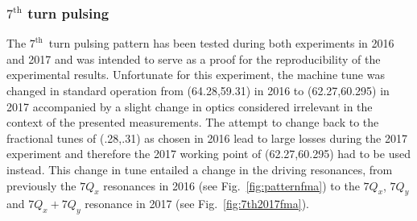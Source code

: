 \documentclass[%
 reprint,
 amsmath,amssymb,
 aps,
prstab,
]{revtex4-1}
\begin{document}
\subsubsection{$7^{\mathrm{th}}$ turn pulsing\label{sec:simex7}}
The $7^{\mathrm{th}}$~turn pulsing pattern has been tested during both experiments in 2016 and 2017 and was intended to serve as a proof for the reproducibility of the experimental results. Unfortunate for this experiment, the machine tune was changed in standard operation from (64.28,59.31) in 2016 to (62.27,60.295) in 2017 accompanied by a slight change in optics considered irrelevant in the context of the presented measurements. The attempt to change back to the fractional tunes of (.28,.31) as chosen in 2016 lead to large losses during the 2017 experiment and therefore the 2017 working point of (62.27,60.295) had to be used instead. This change in tune entailed a change in the driving resonances, from previously the $7Q_x$ resonances in 2016 (see Fig.~\ref{fig:patternfma}) to the $7Q_x$, $7Q_y$ and $7Q_x + 7Q_y$ resonance in 2017 (see Fig.~\ref{fig:7th2017fma}).
\end{document}
